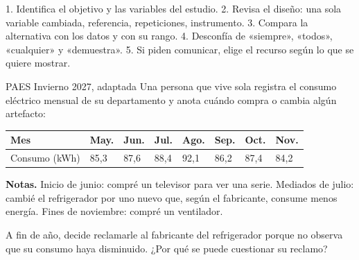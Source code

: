 \begin{clave} 1. Identifica el objetivo y las variables del estudio. 2. Revisa el diseño: una sola variable cambiada, referencia, repeticiones, instrumento. 3. Compara la alternativa con los datos y con su rango. 4. Desconfía de «siempre», «todos», «cualquier» y «demuestra». 5. Si piden comunicar, elige el recurso según lo que se quiere mostrar.\end{clave}
\begin{elejemplo}{PAES Invierno 2027, adaptada}
Una persona que vive sola registra el consumo eléctrico mensual de su departamento y anota cuándo compra o cambia algún artefacto:

\begin{center}\small
\begin{tabular}{@{}llllllll@{}}
\toprule
\textbf{Mes} & \textbf{May.} & \textbf{Jun.} & \textbf{Jul.} & \textbf{Ago.} & \textbf{Sep.} & \textbf{Oct.} & \textbf{Nov.} \\
\midrule
Consumo (kWh) & 85,3 & 87,6 & 88,4 & 92,1 & 86,2 & 87,4 & 84,2 \\
\bottomrule
\end{tabular}
\end{center}

\textbf{Notas.} Inicio de junio: compré un televisor para ver una serie. Mediados de julio: cambié el refrigerador por uno nuevo que, según el fabricante, consume menos energía. Fines de noviembre: compré un ventilador.

A fin de año, decide reclamarle al fabricante del refrigerador porque no observa que su consumo haya disminuido. ¿Por qué se puede cuestionar su reclamo?
\end{elejemplo}
